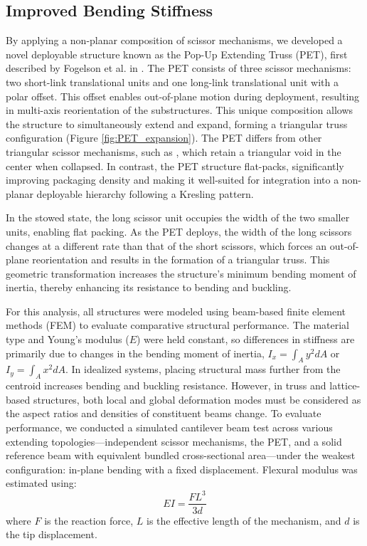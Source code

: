 \subsection{Improved Bending Stiffness}
By applying a non-planar composition of scissor mechanisms, we developed a novel deployable structure known as the Pop-Up Extending Truss (PET), first described by Fogelson et al. in \cite{fogelson2024herds}. {The PET consists of three scissor mechanisms: two short-link translational units and one long-link translational unit with a polar offset. This offset enables out-of-plane motion during deployment, resulting in multi-axis reorientation of the substructures.} This unique composition allows the structure to simultaneously extend and expand, forming a triangular truss configuration (Figure \ref{fig:PET_expansion}). {The PET differs from other triangular scissor mechanisms, such as \cite{you_cable-stiffened_1996}, which retain a triangular void in the center when collapsed. In contrast, the PET structure flat-packs, significantly improving packaging density and making it well-suited for integration into a non-planar deployable hierarchy following a Kresling pattern.}

{In the stowed state, the long scissor unit occupies the width of the two smaller units, enabling flat packing. As the PET deploys, the width of the long scissors changes at a different rate than that of the short scissors, which forces an out-of-plane reorientation and results in the formation of a triangular truss.} This geometric transformation increases the structure’s minimum bending moment of inertia, thereby enhancing its resistance to bending and buckling.

For this analysis, all structures were modeled using beam-based finite element methods (FEM) to evaluate comparative structural performance. The material type and Young’s modulus ($E$) were held constant, so differences in stiffness are primarily due to changes in the bending moment of inertia, $I_x = \int_A y^2 dA$ or $I_y = \int_A x^2 dA$. In idealized systems, placing structural mass further from the centroid increases bending and buckling resistance. {However, in truss and lattice-based structures, both local and global deformation modes must be considered as the aspect ratios and densities of constituent beams change.} {To evaluate performance, we conducted a simulated cantilever beam test across various extending topologies—independent scissor mechanisms, the PET, and a solid reference beam with equivalent bundled cross-sectional area—under the weakest configuration: in-plane bending with a fixed displacement.} Flexural modulus was estimated using:
\begin{equation}
    EI = \frac{FL^3}{3d}
\end{equation}
where $F$ is the reaction force, $L$ is the effective length of the mechanism, and $d$ is the tip displacement.

